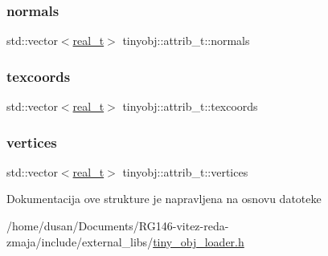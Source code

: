 \mbox{\label{structtinyobj_1_1attrib__t_ac647590e9a03bec3c6cee5c215781e12}} 
\subsubsection{\texorpdfstring{normals}{normals}}
{\footnotesize\ttfamily std\+::vector$<$\hyperlink{namespacetinyobj_ad5ca7469ff56bf0d8423120cfd99adce}{real\+\_\+t}$>$ tinyobj\+::attrib\+\_\+t\+::normals}

\mbox{\label{structtinyobj_1_1attrib__t_aad958a1ea44377cfd3dd007d3b15d887}} 
\subsubsection{\texorpdfstring{texcoords}{texcoords}}
{\footnotesize\ttfamily std\+::vector$<$\hyperlink{namespacetinyobj_ad5ca7469ff56bf0d8423120cfd99adce}{real\+\_\+t}$>$ tinyobj\+::attrib\+\_\+t\+::texcoords}

\mbox{\label{structtinyobj_1_1attrib__t_a1c79c00f3baa0888a5efcfc68a4d419e}} 
\subsubsection{\texorpdfstring{vertices}{vertices}}
{\footnotesize\ttfamily std\+::vector$<$\hyperlink{namespacetinyobj_ad5ca7469ff56bf0d8423120cfd99adce}{real\+\_\+t}$>$ tinyobj\+::attrib\+\_\+t\+::vertices}



Dokumentacija ove strukture je napravljena na osnovu datoteke \begin{DoxyCompactItemize}
\item 
/home/dusan/\+Documents/\+R\+G146-\/vitez-\/reda-\/zmaja/include/external\+\_\+libs/\hyperlink{tiny__obj__loader_8h}{tiny\+\_\+obj\+\_\+loader.\+h}\end{DoxyCompactItemize}
